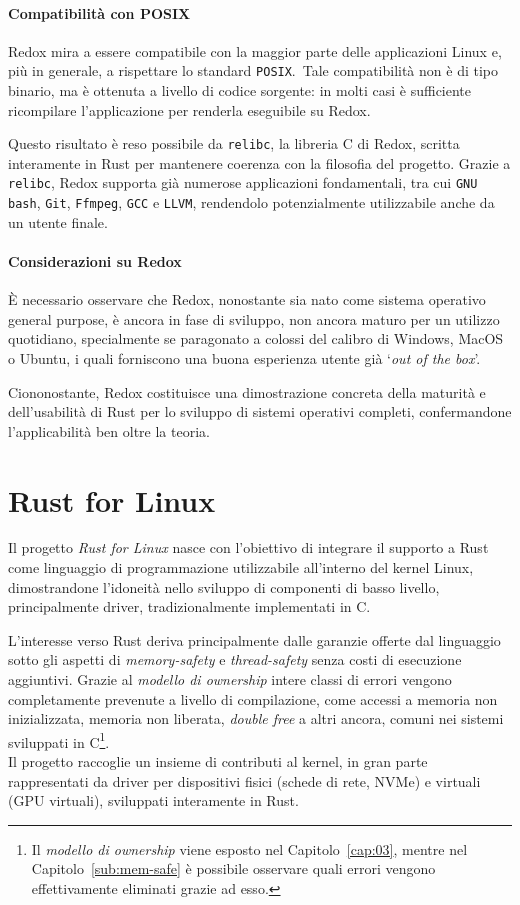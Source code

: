 \paragraph{Compatibilità con POSIX}
Redox mira a essere compatibile con la maggior parte delle applicazioni Linux e, più in generale, a rispettare lo standard \texttt{POSIX}.\ 
Tale compatibilità non è di tipo binario, ma è ottenuta a livello di codice sorgente: in molti casi è sufficiente ricompilare l'applicazione per 
renderla eseguibile su Redox.

Questo risultato è reso possibile da \texttt{relibc}, la libreria C di Redox, scritta interamente in Rust per mantenere coerenza con la filosofia del progetto.
Grazie a \texttt{relibc}, Redox supporta già numerose applicazioni fondamentali, tra cui \texttt{GNU bash}, \texttt{Git}, \texttt{Ffmpeg}, \texttt{GCC} e \texttt{LLVM}, rendendolo
potenzialmente utilizzabile anche da un utente finale.

\paragraph{Considerazioni su Redox}
È necessario osservare che Redox, nonostante sia nato come sistema operativo general purpose, è ancora in fase di sviluppo, non ancora 
maturo per un utilizzo quotidiano, specialmente se paragonato a colossi del calibro di Windows, MacOS o Ubuntu, i quali forniscono una buona esperienza utente già `\textit{out of the box}'.

Ciononostante, Redox costituisce una dimostrazione concreta della maturità e dell'usabilità di Rust per lo sviluppo di sistemi operativi completi, confermandone
l'applicabilità ben oltre la teoria.

\section{Rust for Linux}
Il progetto \textit{Rust for Linux} nasce con l'obiettivo di integrare il supporto a Rust 
come linguaggio di programmazione utilizzabile all'interno del kernel Linux, dimostrandone l'idoneità nello 
sviluppo di componenti di basso livello, principalmente driver, tradizionalmente 
implementati in C.

L'interesse verso Rust deriva principalmente dalle garanzie offerte dal linguaggio sotto gli aspetti di \textit{memory-safety} e \textit{thread-safety} senza
costi di esecuzione aggiuntivi. Grazie al \textit{modello di ownership} intere classi di errori vengono completamente prevenute a livello di compilazione,
come accessi a memoria non inizializzata, memoria non liberata, \textit{double free} a altri ancora, comuni nei sistemi sviluppati in C\footnote{Il \textit{modello di ownership} viene 
esposto nel Capitolo~\ref{cap:03}, mentre nel Capitolo~\ref{sub:mem-safe} è possibile osservare quali errori vengono effettivamente 
eliminati grazie ad esso.}. \hfill 
\vspace{7pt} \\
\noindent Il progetto raccoglie un insieme di contributi al kernel, in gran parte rappresentati da driver per dispositivi fisici
(schede di rete, NVMe) e virtuali (GPU virtuali), sviluppati interamente in Rust.

